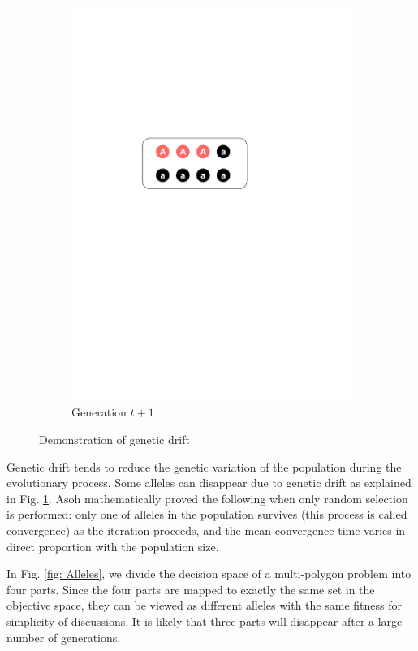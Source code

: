 \documentclass[conference]{IEEEtran}
\begin{document}
\begin{figure}[t!]
\begin{subfigure}[b]{.24\textwidth}
		\includegraphics[width=\linewidth]{Section2/Generation_t1}
		\caption{Generation $t+1$}
	\end{subfigure}
	\caption{Demonstration of genetic drift}
	\label{fig:Genetic drift demo}
\end{figure}

Genetic drift tends to reduce the genetic variation of the population during the evolutionary process. Some alleles can disappear due to genetic drift as explained in Fig. \ref{fig:Genetic drift demo}. Asoh\cite{asoh1994mean} mathematically proved the following when only random selection is performed: only one of alleles in the population survives (this process is called convergence) as the iteration proceeds, and the mean convergence time varies in direct proportion with the population size. 

In Fig. \ref{fig: Alleles}, we divide the decision space of a multi-polygon problem into four parts. Since the four parts are mapped to exactly the same set in the objective space, they can be viewed as different alleles with the same fitness for simplicity of discussions. It is likely that three parts will disappear after a large number of generations.
\end{document}
